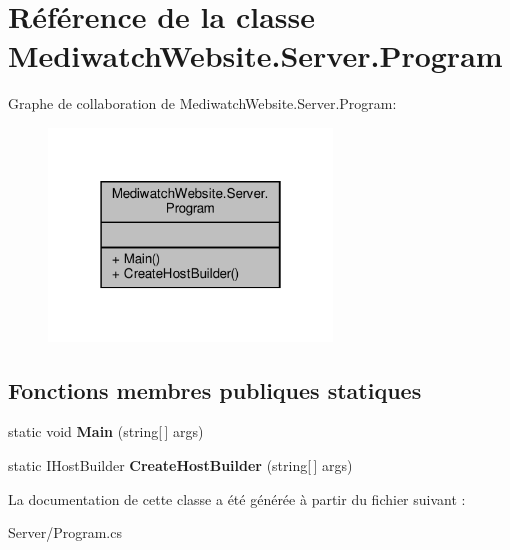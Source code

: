 \hypertarget{class_mediwatch_website_1_1_server_1_1_program}{}\section{Référence de la classe Mediwatch\+Website.\+Server.\+Program}
\label{class_mediwatch_website_1_1_server_1_1_program}


Graphe de collaboration de Mediwatch\+Website.\+Server.\+Program\+:
\nopagebreak
\begin{figure}[H]
\begin{center}
\leavevmode
\includegraphics[width=214pt]{class_mediwatch_website_1_1_server_1_1_program__coll__graph}
\end{center}
\end{figure}
\subsection*{Fonctions membres publiques statiques}
\begin{DoxyCompactItemize}
\item 
\mbox{\label{class_mediwatch_website_1_1_server_1_1_program_aefcfeb926a88108a29b0f089d7a9f38e}} 
static void {\bfseries Main} (string\mbox{[}$\,$\mbox{]} args)
\item 
\mbox{\label{class_mediwatch_website_1_1_server_1_1_program_abdb5d3ebe00278212ac69d53683e24f1}} 
static I\+Host\+Builder {\bfseries Create\+Host\+Builder} (string\mbox{[}$\,$\mbox{]} args)
\end{DoxyCompactItemize}


La documentation de cette classe a été générée à partir du fichier suivant \+:\begin{DoxyCompactItemize}
\item 
Server/Program.\+cs\end{DoxyCompactItemize}

